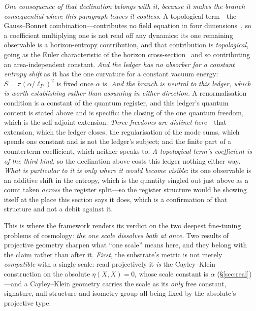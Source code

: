 \documentclass[11pt,a4paper]{article}
\theoremstyle{definition}
\begin{document}
\emph{One consequence of that declination belongs with it, because it makes the branch consequential where
this paragraph leaves it costless.} A topological term---the Gauss--Bonnet combination---contributes no
field equation in four dimensions~\cite{JanzenCanonicalTime}, so a coefficient multiplying one is not read
off any dynamics; its one remaining observable is a horizon-entropy contribution, and that contribution is
\emph{topological}, going as the Euler characteristic of the horizon cross-section~\cite{JacobsonMyers1993}
and so contributing an area-independent constant. \emph{And the ledger has no absorber for a constant
entropy shift} as it has the one curvature for a constant vacuum energy: $S=\pi(\alpha/\ell_P)^{2}$ is fixed
once $\alpha$ is. \emph{And the branch is neutral to this ledger, which is worth establishing rather than assuming in either direction.} A renormalisation condition is a constant of the quantum register, and this ledger's quantum content is stated above and is specific: the closing of the one quantum freedom, which is the self-adjoint extension. \emph{Three freedoms are distinct here}---that extension, which the ledger closes; the regularisation of the mode sums, which spends one constant and is not the ledger's subject; and the finite part of a counterterm coefficient, which neither speaks to. \emph{A topological term's coefficient is of the third kind}, so the declination above costs this ledger nothing either way. \emph{What is particular to it is only where it would become visible}: its one observable is an additive shift in the entropy, which is the quantity singled out just above as a count taken \emph{across} the register split---so the register structure would be showing itself at the place this section says it does, which is a confirmation of that structure and not a debit against it.

This is where the framework renders its verdict on the two deepest fine-tuning problems of cosmology: \emph{the one scale dissolves both at once.} Two results of projective geometry sharpen what ``one scale'' means here, and they belong with the claim rather than after it. \emph{First}, the substrate's metric is not merely \emph{compatible} with a single scale: read projectively it \emph{is} the Cayley--Klein construction on the absolute $\eta(X,X)=0$, whose scale constant is $\alpha$ (\S\ref{sec:real})---and a Cayley--Klein geometry carries the scale as its \emph{only} free constant, signature, null structure and isometry group all being fixed by the absolute's projective type. 
\end{document}
